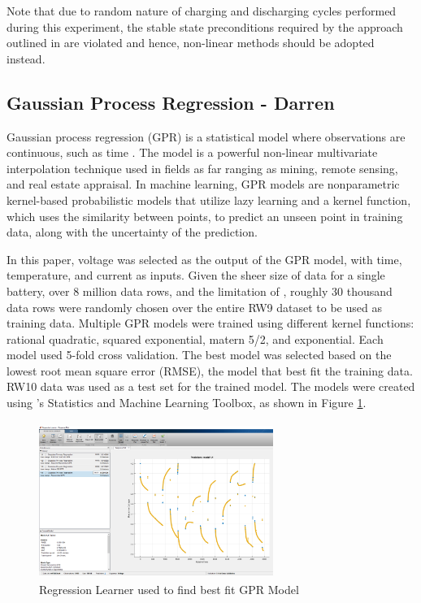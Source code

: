 Note that due to random nature of charging and discharging cycles performed during this experiment, the stable state preconditions required by the approach outlined in \cite{5571895} are violated and hence, non-linear methods should be adopted instead.
\subsection{Gaussian Process Regression - Darren}

Gaussian process regression (GPR) is a statistical model where observations are continuous, such as time \cite{10.1371/journal.pone.0163004}.  The model is a powerful non-linear multivariate interpolation technique used in fields as far ranging as mining, remote sensing, and real estate appraisal. In machine learning, GPR models are nonparametric kernel-based probabilistic models that utilize lazy learning and a kernel function, which uses the similarity between points, to predict an unseen point in training data, along with the uncertainty of the prediction.

In this paper, voltage was selected as the output of the GPR model, with time, temperature, and current as inputs.  Given the sheer size of data for a single battery, over 8 million data rows, and the limitation of \MATLAB, roughly 30 thousand data rows were randomly chosen over the entire RW9 dataset to be used as training data.  Multiple GPR models were trained using different kernel functions: rational quadratic, squared exponential, matern 5/2, and exponential.  Each model used 5-fold cross validation.  The best model was selected based on the lowest root mean square error (RMSE), the model that best fit the training data.  RW10 data was used as a test set for the trained model.  The models were created using \MATLAB ’s Statistics and Machine Learning Toolbox, as shown in Figure \ref{fig:regresion_learner}.

\begin{figure}
 \includegraphics[height=2in, width=3in]{figures/GPR/regresion_learner}
\caption{\MATLAB Regression Learner used to find best fit GPR Model}
\label{fig:regresion_learner}
\end{figure}


